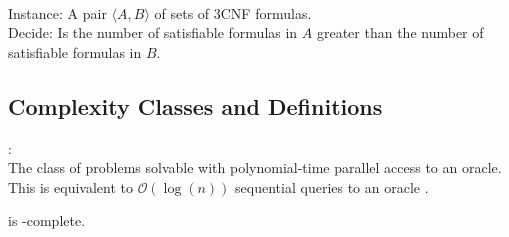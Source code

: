 \begin{problem}{\csat} \citep{compsat}\\
    \tab Instance: A pair $\langle A,B \rangle$ of sets of 3CNF formulas.\\
    \tab Decide: Is the number of satisfiable formulas in $A$
    greater than the number of satisfiable formulas in $B$.
\end{problem}

\subsection{Complexity Classes and Definitions}

\begin{defn}{\tp:} \\
    The class of problems solvable with polynomial-time parallel access to an
    \np oracle.
    This is equivalent to $\mathcal{O}(\log(n))$ sequential queries to an \np
    oracle \citep{hem87, ksw87}.
\end{defn}



\begin{theorem}\label{thm:csat} \citep{compsat}
    \csat is \tp-complete.
\end{theorem}




